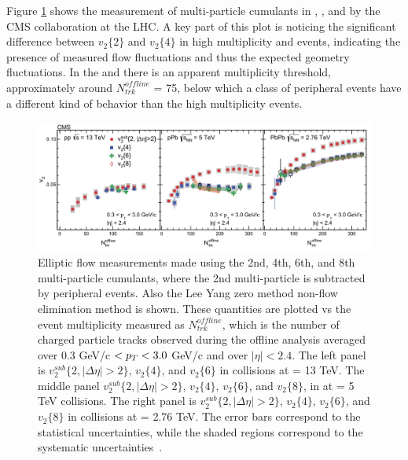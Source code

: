 Figure \ref{fig:pp_pPb_PbPb_cumulants} shows the measurement of multi-particle cumulants in \pp, \ppb, and \pbpb by the CMS collaboration at the LHC. A key part of this plot is noticing the significant difference between $v_2\{2\}$ and $v_2\{4\}$ in high multiplicity \ppb and \pbpb events, indicating the presence of measured flow fluctuations and thus the expected geometry fluctuations. In the \ppb and \pbpb there is an apparent multiplicity threshold, approximately around $N^{offline}_{trk}$ = 75, below which a class of peripheral events have a different kind of behavior than the high multiplicity events. 
\begin{figure}[!ht]
\begin{center}
\includegraphics[width=0.95\linewidth]{figs/pp_pPb_PbPb_cumulants.PNG}
\caption{Elliptic flow measurements made using the 2nd, 4th, 6th, and 8th multi-particle cumulants, where the 2nd multi-particle is subtracted by peripheral events. Also the Lee Yang zero method non-flow elimination method is shown. These quantities are plotted vs the event multiplicity measured as $N^{offline}_{trk}$, which is the number of charged particle tracks observed during the offline analysis averaged over  0.3 GeV/c $< \mbox{$p_T$} < 3.0$ GeV/c and over $|\eta| < 2.4$. The left panel is $v^{sub}_2\{2,|\Delta\eta|> 2\}$, $v_2\{4\}$, and $v_2\{6\}$ in \pp collisions at \sqs = 13 TeV. The middle panel $v^{sub}_2\{2,|\Delta\eta|> 2\}$, $v_2\{4\}$, $v_2\{6\}$, and $v_2\{8\}$, in \ppb at \sqsn = 5 TeV collisions. The right panel is  $v^{sub}_2\{2,|\Delta\eta|> 2\}$, $v_2\{4\}$, $v_2\{6\}$, and $v_2\{8\}$ in \pbpb collisions at \sqsn = 2.76 TeV. The error bars correspond to the statistical uncertainties, while the shaded regions correspond to the systematic uncertainties~\cite{Khachatryan2017193}.}
\label{fig:pp_pPb_PbPb_cumulants}
\end{center}
\end{figure}


